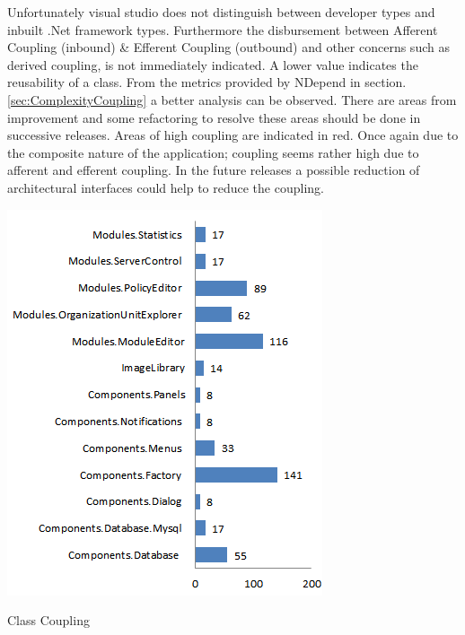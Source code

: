 		\begin{multicols}{2}
		
			Unfortunately visual studio does not distinguish between developer types and inbuilt .Net framework types.
			Furthermore the disbursement between Afferent Coupling (inbound) \& Efferent Coupling (outbound) and other concerns such as derived coupling,
			is not immediately indicated.  A lower value indicates the reusability of a class.
			\newline
			\newline
			From the metrics provided by NDepend in section. \ref{sec:ComplexityCoupling} a better analysis can be observed.
			There are areas from improvement and some refactoring to resolve these areas should be done in successive releases.	
			\newline
			\newline
			Areas of high coupling are indicated in red.  Once again due to the composite nature of the application; coupling
			seems rather high due to afferent and efferent coupling.  In the future releases a possible reduction
			of architectural interfaces could help to reduce the coupling.  
			
			\columnbreak
			
			\begin{figurehere}
				\centering
				\includegraphics[scale=0.9]{pages/chapter4/figures/coupling.png}
				\vspace{-7mm}
				\caption{Class Coupling}
				\label{fig:ClassCoupling}				
			\end{figurehere}
			
		\end{multicols}
		
